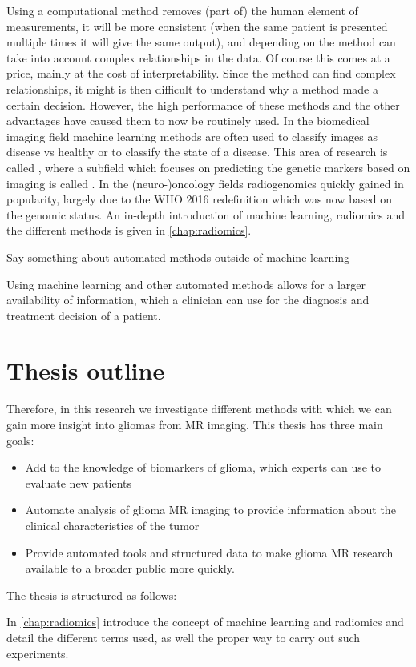 Using a computational method removes (part of) the human element of measurements, it will be more consistent (when the same patient is presented multiple times it will give the same output), and depending on the method can take into account complex relationships in the data.
Of course this comes at a price, mainly at the cost of interpretability.
Since the method can find complex relationships, it might is then difficult to understand why a method made a certain decision.
However, the high performance of these methods and the other advantages have caused them to now be routinely used.
In the biomedical imaging field machine learning methods are often used to classify images as disease vs healthy or to classify the state of a disease.
This area of research is called , where a subfield which focuses on predicting the genetic markers based on imaging is called .
In the (neuro-)oncology fields radiogenomics quickly gained in popularity, largely due to the WHO 2016 redefinition which was now based on the genomic status.
An in-depth introduction of machine learning, radiomics and the different methods is given in \cref{chap:radiomics}.


Say something about automated methods outside of machine learning


Using machine learning and other automated methods allows for a larger availability of information, which a clinician can use for the diagnosis and treatment decision of a patient.

\section{Thesis outline}
Therefore, in this research we investigate different methods with which we can gain more insight into gliomas from MR imaging. This thesis has three main goals:
\begin{itemize}
\item Add to the knowledge of biomarkers of glioma, which experts can use to evaluate new patients
\item Automate analysis of glioma MR imaging to provide information about the clinical characteristics of the tumor
\item Provide automated tools and structured data to make glioma MR research available to a broader public more quickly.
\end{itemize}

The thesis is structured as follows:

In \cref{chap:radiomics} introduce the concept of machine learning and radiomics and detail the different terms used, as well the proper way to carry out such experiments.

